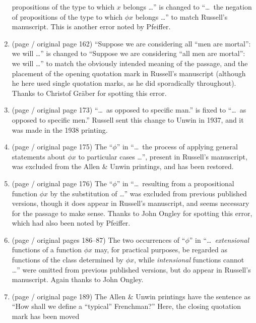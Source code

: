 \begin{enumerate}
propositions of the type to which $x$
belongs \ldots'' is changed to ``\ldots\ the negation of
propositions of the type to which $\phi x$
belongs \ldots'' to match Russell's manuscript. This is another error noted
by Pfeiffer.
\item (page \pageref{change:qm} / original page 162) ``Suppose we are considering all ``men are mortal'': we will \ldots'' is changed to ``Suppose we are considering ``all men are mortal'': we will \ldots'' to match the obviously intended meaning of the passage, and the placement of the opening quotation mark in Russell's manuscript (although he here used single quotation marks, as he did sporadically throughout). Thanks to Christof Gr{\"a}ber for spotting this error.
\item (page \pageref{change:manmen} / original page 173) ``\ldots\ as opposed to specific
man.'' is fixed to ``\ldots\ as opposed to specific
men.'' Russell sent this change to Unwin in 1937, and it was made in the 1938 printing.
\item (page \pageref{change:missingphi175} / original page 175) The ``$\phi$'' in ``\ldots\ the
process of applying general statements about $\phi x$ to
particular cases \ldots'', present in Russell's manuscript, was excluded from the Allen \& Unwin printings, and has been restored.
\item (page \pageref{change:firstmissingphi} / original page 176) The ``$\phi$'' in  
``\ldots\ re\-sult\-ing from a
propositional function \ensuremath{\phi x}
by the substitution of \ldots''
was excluded from previous 
published versions, though it does appear in Russell's manuscript, and
seems necessary for the passage to make sense. \ebkonly{\linebreak[4]}Thanks to John Ongley for
spotting this error, which had also been noted by Pfeiffer.
\item (page \pageref{change:secondmissingphi} / original pages 186--87) The two occurrences of ``$\phi$''  in 
``\ldots\ \textit{ex\-ten\-sion\-al}
functions of a function
$\phi x$
may, for
practical  
purposes,
be regarded as functions of the class determined by $\phi x$, while
\textit{intensional}
functions cannot \ldots''
were
omitted from previous published versions, but do appear in Russell's
manuscript. Again thanks to John Ongley.
\item (page \pageref{change:frenchman} / original page 189) The Allen \& Unwin printings have the sentence as
``How shall we define a ``typical'' Frenchman?'' Here, the closing quotation mark has been \aftonly{\linebreak}moved

\end{enumerate}
